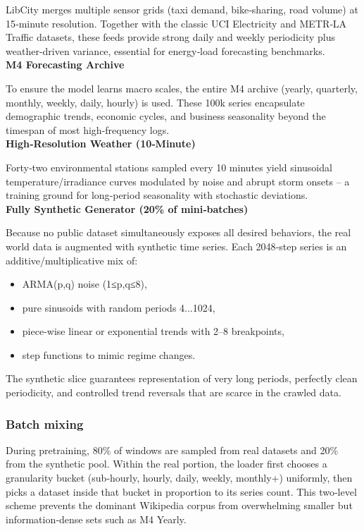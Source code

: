 LibCity merges multiple sensor grids (taxi demand, bike‑sharing, road volume) at 15‑minute resolution. Together with the classic UCI Electricity and METR‑LA Traffic datasets, these feeds provide strong daily and weekly periodicity plus weather‑driven variance, essential for energy‑load forecasting benchmarks.
\\\textbf{M4 Forecasting Archive}

To ensure the model learns macro scales, the entire M4 archive (yearly, quarterly, monthly, weekly, daily, hourly) is used. These 100k series encapsulate demographic trends, economic cycles, and business seasonality beyond the timespan of most high-frequency logs.
\\\textbf{High‑Resolution Weather (10‑Minute)}

Forty‑two environmental stations sampled every 10 minutes yield sinusoidal temperature/irradiance curves modulated by noise and abrupt storm onsets – a training ground for long‑period seasonality with stochastic deviations.
\\\textbf{Fully Synthetic Generator (20\% of mini‑batches)}

Because no public dataset simultaneously exposes all desired behaviors, the real world data is augmented with synthetic time series. Each 2048‑step series is an additive/multiplicative mix of:

\begin{itemize}
    \item ARMA(p,q) noise (1≤p,q≤8),
    \item pure sinusoids with random periods 4...1024,
    \item piece‑wise linear or exponential trends with 2–8 breakpoints,
    \item step functions to mimic regime changes.
\end{itemize}
The synthetic slice guarantees representation of very long periods, perfectly clean periodicity, and controlled trend reversals that are scarce in the crawled data.

\subsubsection{Batch mixing}

During pretraining, 80\% of windows are sampled from real datasets and 20\% from the synthetic pool. Within the real portion, the loader first chooses a granularity bucket (sub‑hourly, hourly, daily, weekly, monthly+) uniformly, then picks a dataset inside that bucket in proportion to its series count. This two‑level scheme prevents the dominant Wikipedia corpus from overwhelming smaller but information‑dense sets such as M4 Yearly.

